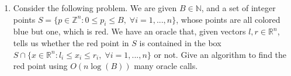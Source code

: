 \documentclass[11pt]{article}
\newcommand{\setR}{\mathbb{R}}
\newcommand{\setZ}{\mathbb{Z}}
\begin{document}
\begin{enumerate}[1)]
\item Consider the following problem. We are given $B ∈\mathbb{N}$, and a set of integer points $S= \{p ∈\setZ^n :
0 ≤p_i ≤B,\; ∀ i = 1,...,n\}$, whose points are all colored blue but one, which is red. We have an
oracle that, given vectors $l,r ∈\setR^n$, tells us whether the red point in $S$ is contained in the box
$S∩\{x ∈\setR^n : l_i ≤x_i ≤r_i,\;∀i = 1,...,n\}$ or not. Give an algorithm to find the red point using
$O(n \log(B))$ many oracle calls.


\end{enumerate}




  
\end{document}
